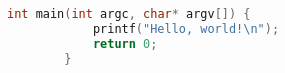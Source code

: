 \documentclass{article}
\begin{document}
	\begin{lstlisting}[language=C]
		int main(int argc, char* argv[]) {
			printf("Hello, world!\n");
			return 0;
		}
	\end{lstlisting}
\end{document}
